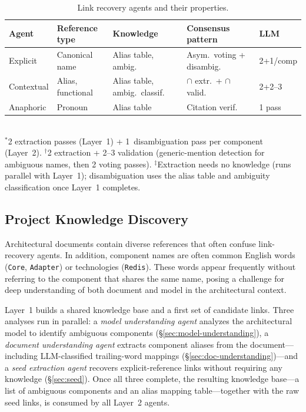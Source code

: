 \begin{table}[t]
\caption{Link recovery agents and their properties.}
\label{tab:strategies}
\centering\footnotesize
\begin{tabular}{@{}lllll@{}}
\toprule
\textbf{Agent} & \textbf{Reference type} & \textbf{Knowledge} & \textbf{Consensus pattern} & \textbf{LLM} \\
\midrule
Explicit & Canonical name & Alias table, ambig.\rlap{$^\ddagger$} & Asym.\ voting + disambig. & 2+1/comp\rlap{$^*$} \\
Contextual & Alias, functional & Alias table, ambig.\ classif. & $\cap$ extr.\ + $\cap$ valid. & 2+2--3\rlap{$^\dagger$} \\
Anaphoric & Pronoun & Alias table & Citation verif. & 1 pass \\
\bottomrule
\end{tabular}
\\[2pt]
{\scriptsize $^*$2 extraction passes (Layer~1) + 1~disambiguation pass per component (Layer~2).
$^\dagger$2 extraction + 2--3 validation (generic-mention detection for ambiguous names, then 2 voting passes).
$^\ddagger$Extraction needs no knowledge (runs parallel with Layer~1);
disambiguation uses the alias table and ambiguity classification once Layer~1 completes.}
\end{table}



\subsection{Project Knowledge Discovery}\label{sec:knowledge}

Architectural documents contain diverse references that often confuse
link-recovery agents.
In addition, component names are often common English words
(\texttt{Core}, \texttt{Adapter}) or technologies (\texttt{Redis}).
These words appear frequently without referring to the component that
shares the same name, posing a challenge for deep understanding of
both document and model in the architectural context.

Layer~1 builds a shared knowledge base and a first set of candidate
links.
Three analyses run in parallel: a \emph{model understanding agent}
analyzes the architectural model to identify ambiguous components
(\S\ref{sec:model-understanding}), a \emph{document understanding
agent} extracts component aliases from the document---including
LLM-classified trailing-word mappings
(\S\ref{sec:doc-understanding})---and a \emph{seed extraction agent}
recovers explicit-reference links without requiring any knowledge
(\S\ref{sec:seed}).
Once all three complete, the resulting knowledge base---a list of
ambiguous components and an alias mapping table---together with the
raw seed links, is consumed by all Layer~2 agents.

